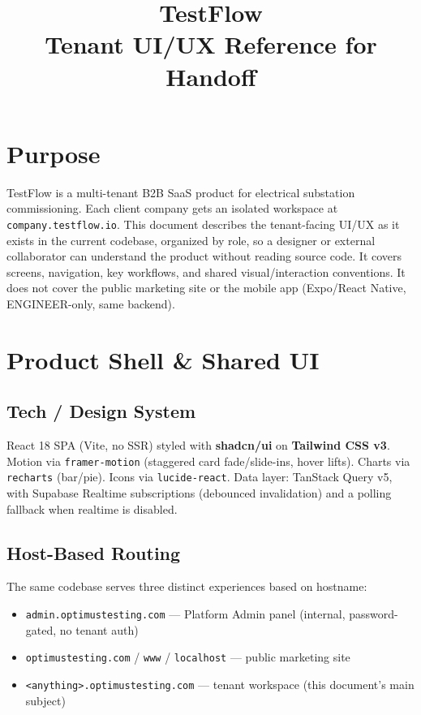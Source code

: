 \documentclass[11pt]{article}
\title{\color{tfblue}TestFlow \\ \large Tenant UI/UX Reference for Handoff}
\author{}
\date{}
\newcommand{\route}[1]{\texttt{#1}}
\begin{document}
\maketitle
\thispagestyle{fancy}

\section*{Purpose}
TestFlow is a multi-tenant B2B SaaS product for electrical substation commissioning. Each client
company gets an isolated workspace at \route{company.testflow.io}. This document describes the
tenant-facing UI/UX as it exists in the current codebase, organized by role, so a designer or
external collaborator can understand the product without reading source code. It covers screens,
navigation, key workflows, and shared visual/interaction conventions. It does not cover the public
marketing site or the mobile app (Expo/React Native, ENGINEER-only, same backend).

\section{Product Shell \& Shared UI}

\subsection{Tech / Design System}
React 18 SPA (Vite, no SSR) styled with \textbf{shadcn/ui} on \textbf{Tailwind CSS v3}. Motion via
\texttt{framer-motion} (staggered card fade/slide-ins, hover lifts). Charts via \texttt{recharts}
(bar/pie). Icons via \texttt{lucide-react}. Data layer: TanStack Query v5, with Supabase Realtime
subscriptions (debounced invalidation) and a polling fallback when realtime is disabled.

\subsection{Host-Based Routing}
The same codebase serves three distinct experiences based on hostname:
\begin{itemize}[nosep]
  \item \texttt{admin.optimustesting.com} --- Platform Admin panel (internal, password-gated, no tenant auth)
  \item \texttt{optimustesting.com} / \texttt{www} / \texttt{localhost} --- public marketing site
  \item \texttt{<anything>.optimustesting.com} --- tenant workspace (this document's main subject)
\end{itemize}
\end{document}
